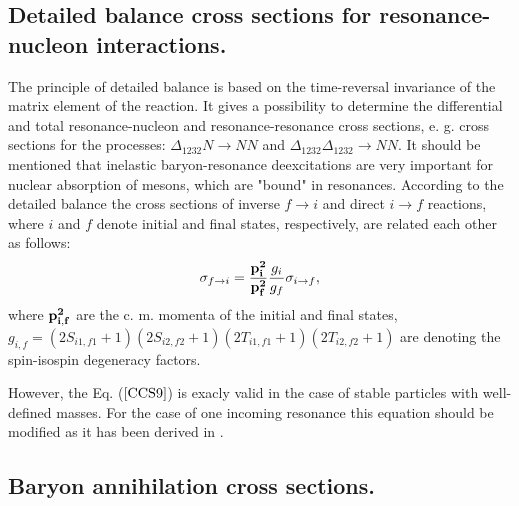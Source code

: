 \subsection{Detailed balance cross sections for resonance-nucleon 
interactions.}

\hspace{1.0em}The principle of detailed balance is based on the
time-reversal invariance of the matrix element of the reaction. It gives
a possibility to determine the differential and total resonance-nucleon
and resonance-resonance cross sections, e. g. cross sections for the
processes: $\Delta_{1232}N\rightarrow NN$ and
$\Delta_{1232}\Delta_{1232}\rightarrow NN$.  It should be mentioned that
inelastic baryon-resonance deexcitations are very important for nuclear
absorption of mesons, which are "bound" in resonances.  According to
the detailed balance the cross sections of inverse $f\rightarrow i$ and
direct $i\rightarrow f$ reactions, where $i$ and $f$ denote initial and
final states, respectively, are related each other as follows:
\begin{equation}
\label{CCS9} \sigma_{f\rightarrow i}=\frac{{\bf p^2_i}}{{\bf p^2_f}}\frac{g_i}
{g_f}\sigma_{i\rightarrow f},
\end{equation}
where ${\bf p^2_{i,f}}$ are the c. m. momenta of the initial and final
states,
$g_{i,f}=(2S_{i1,f1}+1)(2S_{i2,f2}+1)(2T_{i1,f1}+1)(2T_{i2,f2}+1)$ are
denoting the spin-isospin degeneracy factors.

However, the Eq. ($\ref{CCS9}$) is exacly valid in the case of stable
particles with well-defined masses. For the case of one incoming
resonance this equation should be  modified as it has been
derived in \cite{DB91}. 
 
\subsection{Baryon annihilation cross sections.} 

